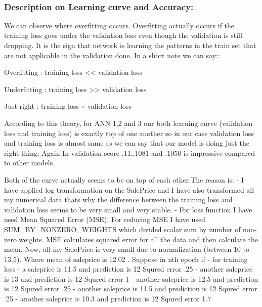 \documentclass[11pt, a4paper , landscape]{article}
\begin{document}
    \begin{center}
    \end{center}
    { \hspace*{\fill} \\}
    
    \subsubsection{Description on Learning curve and
Accuracy:}\label{description-on-learning-curve-and-accuracy}

We can observe where overfitting occurs. Overfitting actually occurs if
the training loss goes under the validation loss even though the
validation is still dropping. It is the sign that network is learning
the patterns in the train set that are not applicable in the validation
done. In a short note we can say::

Overfitting : training loss \textless{}\textless{} validation loss

Underfitting : training loss \textgreater{}\textgreater{} validation
loss

Just right : training loss \textasciitilde{} validation loss

According to this theory, for ANN 1,2 and 3 our both learning curve
(validation loss and training loss) is exactly top of one another so in
our case validation loss and training loss is almost same so we can say
that our model is doing just the right thing. Again In validation score
.11,.1081 and .1050 is impressive compared to other models.

    Both of the curve actually seems to be on top of each other.The reason
is: - I have applied log transformation on the SalePrice and I have also
transformed all my numerical data thats why the difference between the
training loss and validation loss seems to be very small and very
stable. - For loss function I have used Mean Squared Error (MSE). For
reducing MSE I have used SUM\_BY\_NONZERO\_WEIGHTS which divided scalar
sum by number of non-zero weights. MSE calculates squared error for all
the data and then calculate the mean. Now, all my SalePrice is very
small due to normalization (between 10 to 13.5). Where mean of saleprice
is 12.02 . Suppose in nth epoch if - for training loss - a saleprice is
11.5 and prediction is 12 Squred error .25 - another saleprice is 13 and
prediction is 12 Squred error 1 - another saleprice is 12.5 and
prediction is 12 Squred error .25 - another saleprice is 11.5 and
prediction is 12 Squred error .25 - another saleprice is 10.3 and
prediction is 12 Squred error 1.7
\end{document}
